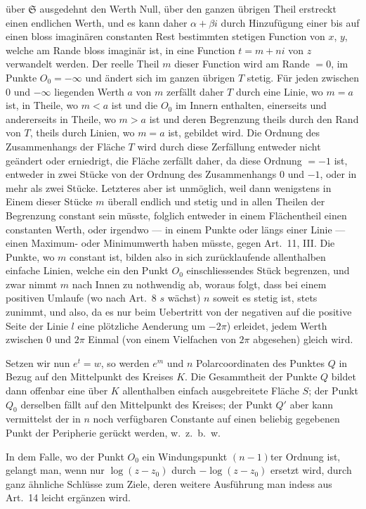 \documentclass[12pt,a4paper]{book}
\theoremstyle{definition}
\theoremstyle{remark}
\begin{document}
über $\mathfrak{S}$ ausgedehnt den Werth Null, über den ganzen übrigen Theil erstreckt einen endlichen Werth, und es kann daher $\alpha + \beta i$ durch Hinzufügung einer bis auf einen bloss imaginären constanten Rest bestimmten stetigen Function von $x$, $y$, welche am Rande bloss imaginär ist, in eine Function $t = m + ni$ von $z$ verwandelt werden. Der reelle Theil $m$ dieser Function wird am Rande $= 0$, im Punkte $O_0 = -\infty$ und ändert sich im ganzen übrigen $T$ stetig. Für jeden zwischen $0$ und $-\infty$ liegenden Werth $a$ von $m$ zerfällt daher $T$ durch eine Linie, wo $m = a$ ist, in Theile, wo $m < a$ ist und die $O_0$ im Innern enthalten, einerseits und andererseits in Theile, wo $m > a$ ist und deren Begrenzung theils durch den Rand von $T$, theils durch Linien, wo $m = a$ ist, gebildet wird. Die Ordnung des Zusammenhangs der Fläche $T$ wird durch diese Zerfällung entweder nicht geändert oder erniedrigt, die Fläche zerfällt daher, da diese Ordnung $= -1$ ist, entweder in zwei Stücke von der Ordnung des Zusammenhangs $0$ und $-1$, oder in mehr als zwei Stücke. Letzteres aber ist unmöglich, weil dann wenigstens in Einem dieser Stücke $m$ überall endlich und stetig und in allen Theilen der Begrenzung constant sein müsste, folglich entweder in einem Flächentheil einen constanten Werth, oder irgendwo --- in einem Punkte oder längs einer Linie --- einen Maximum- oder Minimumwerth haben müsste, gegen Art.~11, III. Die Punkte, wo $m$ constant ist, bilden also in sich zurücklaufende allenthalben einfache Linien, welche ein den Punkt $O_0$ einschliessendes Stück begrenzen, und zwar nimmt $m$ nach Innen zu nothwendig ab, woraus folgt, dass bei einem positiven Umlaufe (wo nach Art.~8 $s$ wächst) $n$ soweit es stetig ist, stets zunimmt, und also, da es nur beim Uebertritt von der negativen auf die positive Seite der Linie $l$ eine plötzliche Aenderung um $-2\pi$) erleidet, jedem Werth zwischen $0$ und $2\pi$ Einmal (von einem Vielfachen von $2\pi$ abgesehen) gleich wird.

Setzen wir nun $e^t = w$, so werden $e^m$ und $n$ Polarcoordinaten des Punktes $Q$ in Bezug auf den Mittelpunkt des Kreises $K$. Die Gesammtheit der Punkte $Q$ bildet dann offenbar eine über $K$ allenthalben einfach ausgebreitete Fläche $S$; der Punkt $Q_0$ derselben fällt auf den Mittelpunkt des Kreises; der Punkt $Q'$ aber kann vermittelst der in $n$ noch verfügbaren Constante auf einen beliebig gegebenen Punkt der Peripherie gerückt werden, w.~z.~b.~w.

In dem Falle, wo der Punkt $O_0$ ein Windungspunkt $(n - 1)$ter Ordnung ist, gelangt man, wenn nur $\log(z - z_0)$ durch $-\log(z - z_0)$ ersetzt wird, durch ganz ähnliche Schlüsse zum Ziele, deren weitere Ausführung man indess aus Art.~14 leicht ergänzen wird.
\end{document}
